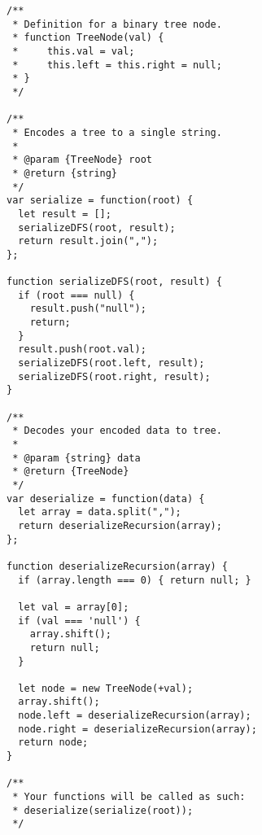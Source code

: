 \begin{verbatim}
/**
 * Definition for a binary tree node.
 * function TreeNode(val) {
 *     this.val = val;
 *     this.left = this.right = null;
 * }
 */

/**
 * Encodes a tree to a single string.
 *
 * @param {TreeNode} root
 * @return {string}
 */
var serialize = function(root) {
  let result = [];
  serializeDFS(root, result);
  return result.join(",");
};

function serializeDFS(root, result) {
  if (root === null) {
    result.push("null");
    return;
  }
  result.push(root.val);
  serializeDFS(root.left, result);
  serializeDFS(root.right, result);
}

/**
 * Decodes your encoded data to tree.
 *
 * @param {string} data
 * @return {TreeNode}
 */
var deserialize = function(data) {
  let array = data.split(",");
  return deserializeRecursion(array);
};

function deserializeRecursion(array) {
  if (array.length === 0) { return null; }

  let val = array[0];
  if (val === 'null') {
    array.shift();
    return null;
  }

  let node = new TreeNode(+val);
  array.shift();
  node.left = deserializeRecursion(array);
  node.right = deserializeRecursion(array);
  return node;
}

/**
 * Your functions will be called as such:
 * deserialize(serialize(root));
 */
\end{verbatim}

